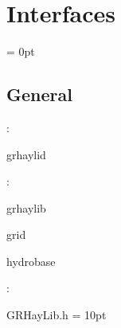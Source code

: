 
\section{Interfaces} 


\parskip = 0pt

\vspace{3mm} \subsection*{General}

: 

grhaylid
\vspace{2mm}

: 

grhaylib

grid

hydrobase
\vspace{2mm}

\vspace{5mm}

: 

GRHayLib.h
\vspace{2mm}\parskip = 10pt 
